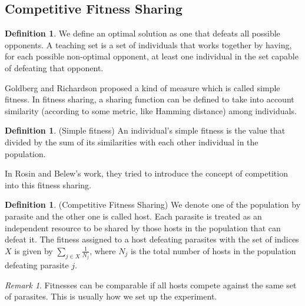 \documentclass[a4paper,11pt]{report}
\theoremstyle{plain} %
\theoremstyle{definition} %
\newtheorem{defn}[thm]{Definition}
\theoremstyle{remark} %
\newtheorem*{rem}{Remark}
\begin{document}
\subsection{Competitive Fitness Sharing}
\begin{defn}We define an optimal solution as one that defeats all possible opponents. A teaching set is a set of individuals that works together by having, for each possible non-optimal opponent, at least one individual in the set capable of defeating that opponent.
\end{defn}
\par Goldberg and Richardson \citep{goldberg1987genetic} proposed a kind of measure which is called simple fitness. In fitness sharing, a sharing function can be defined to take into account similarity (according to some metric, like Hamming distance) among individuals.
\begin{defn}(Simple fitness) An individual's simple fitness is the value that divided by the sum of its similarities with each other individual in the population.
\end{defn}

\par In Rosin and Belew's work, they tried to introduce the concept of competition into this fitness sharing.

\begin{defn}(Competitive Fitness Sharing)
We denote one of the population by parasite and the other one is called host. Each parasite is treated as an independent resource to be shared by those hosts in the population that can defeat it. The fitness assigned to a host defeating parasites with the set of indices $X$ is given by $\sum_{j\in X}\frac{1}{N_{j}}$, where $N_{j}$ is the total number of hosts in the population defeating parasite $j$. 

\end{defn}
\begin{rem} Fitnesses can be comparable if all hosts compete against the same set of parasites. This is usually how we set up the experiment.

\end{rem}
\end{document}
